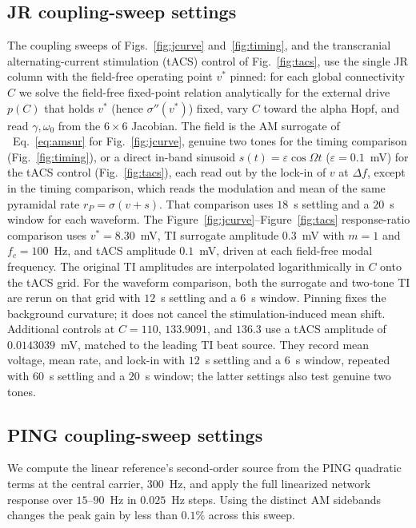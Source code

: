 \documentclass[11pt,a4paper]{article}
\newif\ifjne
\newif\ifsupp
\newcommand{\Sig}{\sigma}
\begin{document}
\subsection{JR coupling-sweep settings}\label{app:jr-sweep-settings}
The coupling sweeps of Figs.~\ref{fig:jcurve} and~\ref{fig:timing}, and the transcranial
alternating-current stimulation (tACS) control of Fig.~\ref{fig:tacs}, use the single JR
column with the field-free operating point $v^*$ pinned: for
each global connectivity $C$ we solve the field-free fixed-point relation analytically
for the external drive $p(C)$ that holds $v^*$ (hence $\Sig''(v^*)$) fixed, vary $C$
toward the alpha Hopf, and read $\gamma,\omega_0$ from the $6\times6$ Jacobian. The field
is the AM surrogate of \ifsupp main-text\fi\ Eq.~\eqref{eq:amsur} for Fig.~\ref{fig:jcurve}, genuine two
tones for the timing comparison (Fig.~\ref{fig:timing}), or a direct in-band sinusoid $s(t)=\varepsilon\cos\Omega t$
($\varepsilon=0.1$~mV) for the tACS control (Fig.~\ref{fig:tacs}), each read out by the
lock-in of $v$ at $\Delta f$, except in the timing comparison, which reads the
modulation and mean of the same pyramidal rate $r_P=\Sig(v+s)$.
That comparison uses $18$~s settling and a $20$~s window for each waveform.
The Figure~\ref{fig:jcurve}--Figure~\ref{fig:tacs} response-ratio comparison uses
$v^*=8.30$~mV, TI surrogate amplitude $0.3$~mV with $m=1$ and $f_c=100$~Hz,
and tACS amplitude $0.1$~mV, driven at each field-free modal frequency.
The original TI amplitudes are interpolated logarithmically in $C$ onto the tACS
grid. For the waveform comparison, both the surrogate and two-tone TI are rerun
on that grid with $12$~s settling and a $6$~s window.
Pinning fixes the background curvature; it does not cancel the stimulation-induced
mean shift.
Additional controls at $C=110$, $133.9091$, and $136.3$ use a tACS amplitude of
$0.0143039$~mV, matched to the leading TI beat source. They record mean voltage,
mean rate, and lock-in with $12$~s settling and a $6$~s window, repeated with
$60$~s settling and a $20$~s window; the latter settings also test genuine two tones.


\ifjne
\subsection{PING coupling-sweep settings}\label{supp:ping-runs}
We compute the linear reference's
second-order source from the PING quadratic terms at the central carrier,
$300$~Hz, and apply the full linearized network response over $15$--$90$~Hz
in $0.025$~Hz steps. Using the distinct AM sidebands changes the peak gain by
less than $0.1\%$ across this sweep.
\end{document}
